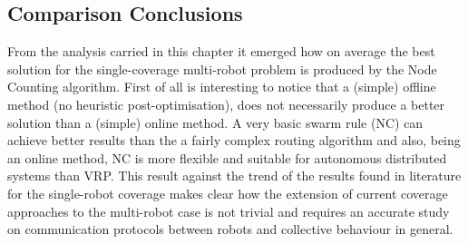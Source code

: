 \subsection{Comparison Conclusions}
From the analysis carried in this chapter it emerged how on average the best solution for the single-coverage multi-robot problem is produced by the Node Counting algorithm. First of all is interesting to notice that a (simple) offline method (no heuristic post-optimisation), does not necessarily produce a better solution than a (simple) online method. A very basic swarm rule (NC) can achieve better results than the a fairly complex routing algorithm and also, being an online method, NC is more flexible and suitable for autonomous distributed systems than VRP.
This result against the trend of the results found in literature for the single-robot coverage makes clear how the extension of current coverage approaches to the multi-robot case is not trivial and requires an accurate study on communication protocols between robots and collective behaviour in general.

